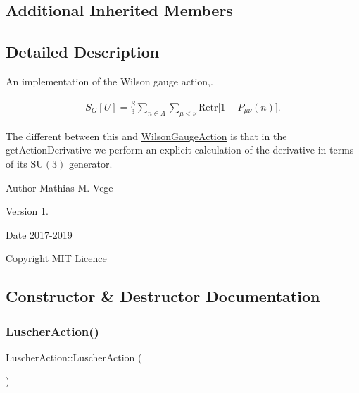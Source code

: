 \subsection*{Additional Inherited Members}


\subsection{Detailed Description}
An implementation of the Wilson gauge action,. 

\begin{eqnarray*} S_G[U] = \frac{\beta}{3} \sum_{n\in\Lambda} \sum_{\mu<\nu} \mathrm{Re} \mathrm{tr} \big[ 1 - P_{\mu\nu}(n) \big]. \end{eqnarray*}

The different between this and \mbox{\hyperlink{class_wilson_gauge_action}{Wilson\+Gauge\+Action}} is that in the get\+Action\+Derivative we perform an explicit calculation of the derivative in terms of its $\mathrm{SU}(3)$ generator.

\begin{DoxyAuthor}{Author}
Mathias M. Vege 
\end{DoxyAuthor}
\begin{DoxyVersion}{Version}
1. 
\end{DoxyVersion}
\begin{DoxyDate}{Date}
2017-\/2019 
\end{DoxyDate}
\begin{DoxyCopyright}{Copyright}
M\+IT Licence 
\end{DoxyCopyright}


\subsection{Constructor \& Destructor Documentation}
\mbox{\label{class_luscher_action_a2389aab5b35b4c5ccb0ae5a45f68430b}} 
\subsubsection{\texorpdfstring{LuscherAction()}{LuscherAction()}}
{\footnotesize\ttfamily Luscher\+Action\+::\+Luscher\+Action (\begin{DoxyParamCaption}{ }\end{DoxyParamCaption})}

